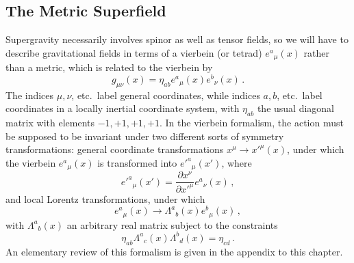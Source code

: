
\providecommand{\SuperD}{\mathcal{D}}

\subsection{The Metric Superfield}

Supergravity necessarily involves spinor as well as tensor fields, so we will
have to describe gravitational fields in terms of a vierbein (or tetrad)
\(e^a{}_\mu(x)\) rather than a metric, which is related to the vierbein by
\begin{equation}
  g_{\mu\nu}(x)=\eta_{ab}e^a{}_\mu(x)e^b{}_\nu(x)\,.
  \tag{31.1.1}\label{eq:31.1.1}
\end{equation}
The indices \(\mu,\nu\), etc.\ label general coordinates, while indices
\(a,b\), etc.\ label coordinates in a locally inertial coordinate system,
with \(\eta_{ab}\) the usual diagonal matrix with elements
\(-1,+1,+1,+1\). In the vierbein formalism, the action must be supposed to be
invariant under two different sorts of symmetry transformations: general
coordinate transformations \(x^\mu\to x'^\mu(x)\), under which the vierbein
\(e^a{}_\mu(x)\) is transformed into \(e'^a{}_\mu(x')\), where
\begin{equation}
  e'^a{}_\mu(x')
  =\frac{\partial x^\nu}{\partial x'^\mu}e^a{}_\nu(x)\,,
  \tag{31.1.2}\label{eq:31.1.2}
\end{equation}
and local Lorentz transformations, under which
\begin{equation}
  e^a{}_\mu(x)\to\Lambda^a{}_b(x)e^b{}_\mu(x)\,,
  \tag{31.1.3}\label{eq:31.1.3}
\end{equation}
with \(\Lambda^a{}_b(x)\) an arbitrary real matrix subject to the constraints
\begin{equation}
  \eta_{ab}\Lambda^a{}_c(x)\Lambda^b{}_d(x)=\eta_{cd}\,.
  \tag{31.1.4}\label{eq:31.1.4}
\end{equation}
An elementary review of this formalism is given in the appendix to this
chapter.

